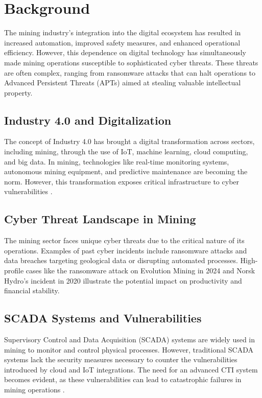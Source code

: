 \documentclass[a4paper,twoside,12pt]{report}
\begin{document}
\section{Background}
The mining industry's integration into the digital ecosystem has resulted in increased automation, improved safety measures, and enhanced operational efficiency. However, this dependence on digital technology has simultaneously made mining operations susceptible to sophisticated cyber threats. These threats are often complex, ranging from ransomware attacks that can halt operations to Advanced Persistent Threats (APTs) aimed at stealing valuable intellectual property.

\subsection{Industry 4.0 and Digitalization}
The concept of Industry 4.0 has brought a digital transformation across sectors, including mining, through the use of IoT, machine learning, cloud computing, and big data. In mining, technologies like real-time monitoring systems, autonomous mining equipment, and predictive maintenance are becoming the norm. However, this transformation exposes critical infrastructure to cyber vulnerabilities \citep{wang2013cyber, sajid2016cloud}.

\subsection{Cyber Threat Landscape in Mining}
The mining sector faces unique cyber threats due to the critical nature of its operations. Examples of past cyber incidents include ransomware attacks and data breaches targeting geological data or disrupting automated processes. High-profile cases like the ransomware attack on Evolution Mining in 2024 and Norsk Hydro's incident in 2020 illustrate the potential impact on productivity and financial stability.

\subsection{SCADA Systems and Vulnerabilities}
Supervisory Control and Data Acquisition (SCADA) systems are widely used in mining to monitor and control physical processes. However, traditional SCADA systems lack the security measures necessary to counter the vulnerabilities introduced by cloud and IoT integrations. The need for an advanced CTI system becomes evident, as these vulnerabilities can lead to catastrophic failures in mining operations \citep{wang2013cyber}.
\end{document}
